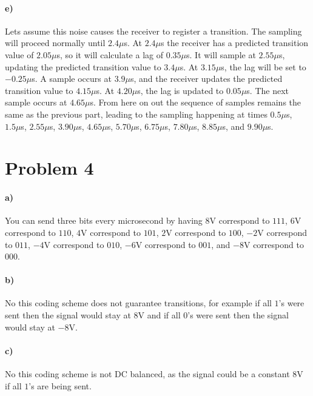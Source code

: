 \documentclass[12pt]{article}
\begin{document}
\paragraph{e)}

Lets assume this noise causes the receiver to register a transition. The sampling will proceed normally until \(2.4\mu\)s. At \(2.4\mu\)s the receiver has a predicted
transition value of \(2.05\mu\)s, so it will calculate a lag of \(0.35\mu\)s. It will sample at \(2.55\mu\)s, updating the predicted transition value to \(3.4\mu\)s. At \(3.15\mu\)s,
the lag will be set to \(-0.25\mu\)s. A sample occurs at \(3.9\mu\)s, and the receiver updates the predicted transition value to \(4.15\mu\)s. At \(4.20\mu\)s, the lag is updated to
\(0.05\mu\)s. The next sample occurs at \(4.65\mu\)s. From here on out the sequence of samples remains the same as the previous part, leading to the sampling happening at times
 \(0.5\mu\)s, \(1.5\mu\)s, \(2.55\mu\)s, \(3.90\mu\)s, \(4.65\mu\)s, \(5.70\mu\)s, \(6.75\mu\)s, \(7.80\mu\)s, \(8.85\mu\)s, and \(9.90\mu\)s.

\section*{Problem 4}

\paragraph{a)}

You can send three bits every microsecond by having \(8\)V correspond to \(111\), \(6\)V correspond to \(110\), \(4\)V correspond to \(101\), \(2\)V correspond to \(100\),
\(-2\)V correspond to \(011\), \(-4\)V correspond to \(010\), \(-6\)V correspond to \(001\), and \(-8\)V correspond to \(000\).

\paragraph{b)}

No this coding scheme does not guarantee transitions, for example if all \(1\)'s were sent then the signal would stay at \(8\)V and if all \(0\)'s were sent then the signal would stay at \(-8\)V.

\paragraph{c)}

No this coding scheme is not DC balanced, as the signal could be a constant \(8\)V if all \(1\)'s are being sent.
\end{document}
